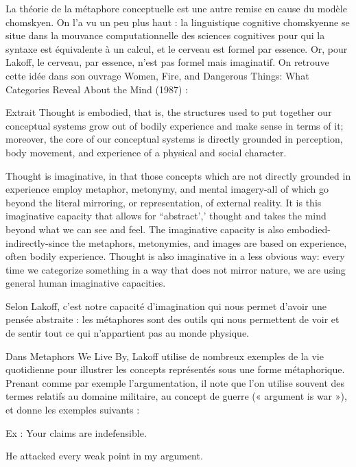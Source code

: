La théorie de la métaphore conceptuelle est une autre remise en cause du modèle chomskyen. On l’a vu un peu plus haut : la linguistique cognitive chomskyenne se situe dans la mouvance computationnelle des sciences cognitives pour qui la syntaxe est équivalente à un calcul, et le cerveau est formel par essence. Or, pour Lakoff, le cerveau, par essence, n’est pas formel mais imaginatif. On retrouve cette idée dans son ouvrage Women, Fire, and Dangerous Things: What Categories Reveal About the Mind (1987) : 
\begin{lecture}{Extrait}
Thought is embodied, that is, the structures used to put together our conceptual systems grow out of bodily experience and make sense in terms of it; moreover, the core of our conceptual systems is directly grounded in perception, body movement, and experience of a physical and social character.\par
Thought is imaginative, in that those concepts which are not directly grounded in experience employ metaphor, metonymy, and mental imagery-all of which go beyond the literal mirroring, or representation, of external reality. It is this imaginative capacity that allows for “abstract’,’ thought and takes the mind beyond what we can see and feel. The imaginative capacity is also embodied-indirectly-since the metaphors, metonymies, and images are based on experience, often bodily experience. Thought is also imaginative in a less obvious way: every time we categorize something in a way that does not mirror nature, we are using general human imaginative capacities.
\end{lecture}
 Selon Lakoff, c’est notre capacité d’imagination qui nous permet d’avoir une pensée abstraite : les métaphores sont des outils qui nous permettent de voir et de sentir tout ce qui n’appartient pas au monde physique.\par


Dans Metaphors We Live By, Lakoff utilise de nombreux exemples de la vie quotidienne pour illustrer les concepts représentés sous une forme métaphorique. Prenant comme par exemple l’argumentation, il note que l’on utilise souvent des termes relatifs au domaine militaire, au concept de guerre (« argument is war »), et donne les exemples suivants :\par

Ex : Your claims are indefensible.\par

He attacked every weak point in my argument.\par

